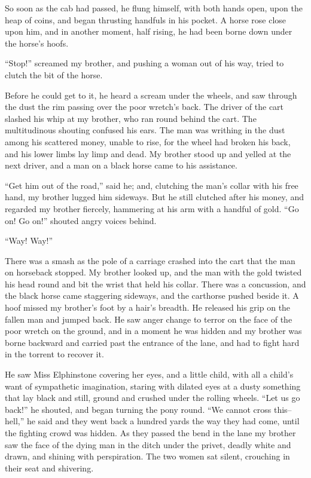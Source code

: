So soon as the cab had passed, he flung himself, with both hands
open, upon the heap of coins, and began thrusting handfuls in his
pocket. A horse rose close upon him, and in another moment, half
rising, he had been borne down under the horse's hoofs.

``Stop!'' screamed my brother, and pushing a woman out of his way,
tried to clutch the bit of the horse.

Before he could get to it, he heard a scream under the wheels, and
saw through the dust the rim passing over the poor wretch's back.
The driver of the cart slashed his whip at my brother, who ran
round behind the cart. The multitudinous shouting confused his
ears. The man was writhing in the dust among his scattered money,
unable to rise, for the wheel had broken his back, and his lower
limbs lay limp and dead. My brother stood up and yelled at the next
driver, and a man on a black horse came to his assistance.

``Get him out of the road,'' said he; and, clutching the man's collar
with his free hand, my brother lugged him sideways. But he still
clutched after his money, and regarded my brother fiercely,
hammering at his arm with a handful of gold. ``Go on! Go on!''
shouted angry voices behind.

``Way! Way!''

There was a smash as the pole of a carriage crashed into the cart
that the man on horseback stopped. My brother looked up, and the
man with the gold twisted his head round and bit the wrist that
held his collar. There was a concussion, and the black horse came
staggering sideways, and the carthorse pushed beside it. A hoof
missed my brother's foot by a hair's breadth. He released his grip
on the fallen man and jumped back. He saw anger change to terror on
the face of the poor wretch on the ground, and in a moment he was
hidden and my brother was borne backward and carried past the
entrance of the lane, and had to fight hard in the torrent to
recover it.

He saw Miss Elphinstone covering her eyes, and a little child, with
all a child's want of sympathetic imagination, staring with dilated
eyes at a dusty something that lay black and still, ground and
crushed under the rolling wheels. ``Let us go back!'' he shouted, and
began turning the pony round. ``We cannot cross this--hell,'' he said
and they went back a hundred yards the way they had come, until the
fighting crowd was hidden. As they passed the bend in the lane my
brother saw the face of the dying man in the ditch under the
privet, deadly white and drawn, and shining with perspiration. The
two women sat silent, crouching in their seat and shivering.

